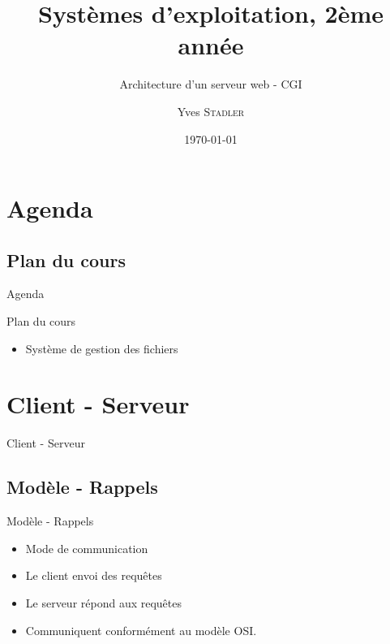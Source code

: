 \title{Systèmes d'exploitation, 2ème année}
\subtitle{Architecture d'un serveur web - CGI}

\author{Yves \textsc{Stadler}}

\date{\today}



\begin{frame}
\titlepage
\end{frame}

\def\sectitle{Agenda}
\section{\sectitle}
\def\subsectitle{Plan du cours}
\subsection{\subsectitle}

\begin{frame}{\sectitle}
\begin{block}{\subsectitle}
\begin{itemize}
\item Système de gestion des fichiers
\end{itemize}
\end{block}
\end{frame}

\def\sectitle{Client - Serveur}
\section{\sectitle}
\begin{frame}{\sectitle}
    \def\subsectitle{Modèle - Rappels}
    \subsection{\subsectitle}
    \begin{block}{\subsectitle}
        \begin{itemize}
            \item Mode de communication
            \item Le client envoi des requêtes
            \item Le serveur répond aux requêtes
            \item Communiquent conformément au modèle OSI.
        \end{itemize}
    \end{block}
\end{frame}

